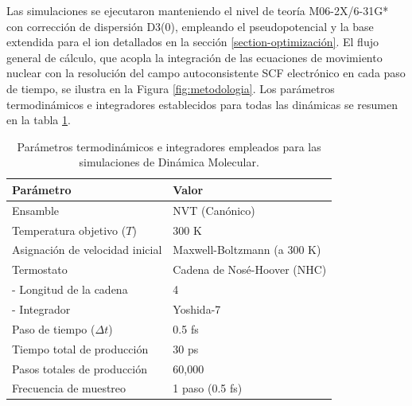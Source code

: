 Las simulaciones se ejecutaron manteniendo el nivel de teoría M06-2X/6-31G* con corrección de dispersión D3(0), empleando el pseudopotencial y la base extendida para el ion  detallados en la sección \ref{section-optimización}. El flujo general de cálculo, que acopla la integración de las ecuaciones de movimiento nuclear con la resolución del campo autoconsistente SCF electrónico en cada paso de tiempo, se ilustra en la Figura \ref{fig:metodologia}. Los parámetros termodinámicos e integradores establecidos para todas las dinámicas se resumen en la tabla \ref{tab:md_params}.

\begin{table}[htbp]
    \centering
    \caption{Parámetros termodinámicos e integradores empleados para las simulaciones de Dinámica Molecular.}
    \label{tab:md_params}
    \begin{tabular}{ll}
        \hline
        \textbf{Parámetro} & \textbf{Valor} \\ \hline
        Ensamble & NVT (Canónico) \\
        Temperatura objetivo ($T$) & 300 K \\
        Asignación de velocidad inicial & Maxwell-Boltzmann (a 300 K) \\
        Termostato & Cadena de Nosé-Hoover (NHC) \\
        \quad - Longitud de la cadena & 4 \\
        \quad - Integrador & Yoshida-7 \\
        Paso de tiempo ($\Delta t$) & 0.5 fs \\
        Tiempo total de producción & 30 ps \\
        Pasos totales de producción & 60,000 \\
        Frecuencia de muestreo & 1 paso (0.5 fs) \\ \hline
    \end{tabular}
\end{table}

